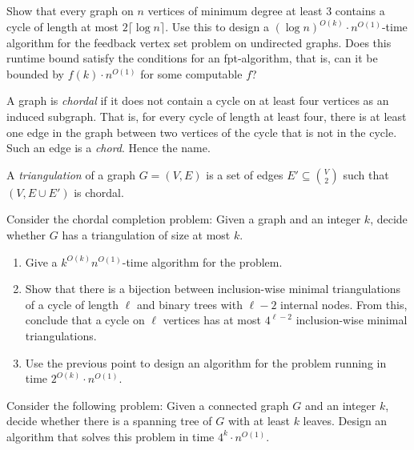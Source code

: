 \documentclass{uebung_cs}
\begin{document}
  \begin{exercise}
  Show that every graph on $n$ vertices of minimum degree at least $3$ contains a cycle of length at most $2\lceil \log n\rceil$.
  Use this to design a $(\log n)^{O(k)} \cdot  n^{O(1)}$-time algorithm for the feedback vertex set problem on undirected graphs.
  Does this runtime bound satisfy the conditions for an fpt-algorithm, that is, can it be bounded by $f(k) \cdot n^{O(1)}$ for some computable $f$?
  \end{exercise}
  
  \begin{exercise}[\hard]
  A graph is \emph{chordal} if it does not contain a cycle on at least four vertices as an induced subgraph.
  That is, for every cycle of length at least four, 
  there is at least one edge in the graph between two vertices of the cycle that is not in the cycle. 
  Such an edge is a \emph{chord}. Hence the name.
  
  A \emph{triangulation} of a graph $G=(V,E)$ is a set of edges $E' \subseteq \binom{V}{2}$ such that $(V,E\cup E')$ is chordal.
  
  Consider the chordal completion problem: Given a graph and an integer $k$, decide whether $G$ has a triangulation of size at most $k$. 
  \begin{enumerate}
  \item Give a $k^{O(k)} n^{O(1)}$-time algorithm for the problem.
  \item Show that there is a bijection between inclusion-wise minimal triangulations of a cycle of length $\ell$ and binary trees with $\ell-2$ internal nodes. From this, conclude that a cycle on $\ell$ vertices has at most $4^{\ell-2}$ inclusion-wise minimal triangulations.
  \item Use the previous point to design an algorithm for the problem running in time $2^{O(k)} \cdot n^{O(1)}$.
  \end{enumerate}
  \end{exercise}
  
  \begin{exercise}[\hard]
  Consider the following problem: Given a connected graph $G$ and an integer $k$, decide whether there is a spanning tree of $G$ with at least $k$ leaves. Design an algorithm that solves this problem in time $4^k \cdot n^{O(1)}$.
  \end{exercise}
\end{document}
